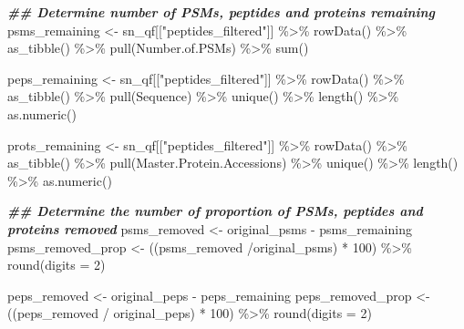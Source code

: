 \documentclass[9pt,a4paper,]{extarticle}
\newenvironment{Shaded}{\begin{snugshade}}{\end{snugshade}}
\newcommand{\AttributeTok}[1]{\textcolor[rgb]{0.77,0.63,0.00}{#1}}
\newcommand{\DecValTok}[1]{\textcolor[rgb]{0.00,0.00,0.81}{#1}}
\newcommand{\DocumentationTok}[1]{\textcolor[rgb]{0.56,0.35,0.01}{\textbf{\textit{#1}}}}
\newcommand{\FunctionTok}[1]{\textcolor[rgb]{0.00,0.00,0.00}{#1}}
\newcommand{\NormalTok}[1]{#1}
\newcommand{\OtherTok}[1]{\textcolor[rgb]{0.56,0.35,0.01}{#1}}
\newcommand{\SpecialCharTok}[1]{\textcolor[rgb]{0.00,0.00,0.00}{#1}}
\newcommand{\StringTok}[1]{\textcolor[rgb]{0.31,0.60,0.02}{#1}}
\begin{document}
\begin{Shaded}
\begin{Highlighting}[]
\DocumentationTok{\#\# Determine number of PSMs, peptides and proteins remaining}
\NormalTok{psms\_remaining }\OtherTok{\textless{}{-}}\NormalTok{ sn\_qf[[}\StringTok{"peptides\_filtered"}\NormalTok{]] }\SpecialCharTok{\%\textgreater{}\%}
  \FunctionTok{rowData}\NormalTok{() }\SpecialCharTok{\%\textgreater{}\%} 
  \FunctionTok{as\_tibble}\NormalTok{() }\SpecialCharTok{\%\textgreater{}\%} 
  \FunctionTok{pull}\NormalTok{(Number.of.PSMs) }\SpecialCharTok{\%\textgreater{}\%} 
  \FunctionTok{sum}\NormalTok{() }

\NormalTok{peps\_remaining }\OtherTok{\textless{}{-}}\NormalTok{ sn\_qf[[}\StringTok{"peptides\_filtered"}\NormalTok{]] }\SpecialCharTok{\%\textgreater{}\%}
  \FunctionTok{rowData}\NormalTok{() }\SpecialCharTok{\%\textgreater{}\%} 
  \FunctionTok{as\_tibble}\NormalTok{() }\SpecialCharTok{\%\textgreater{}\%} 
  \FunctionTok{pull}\NormalTok{(Sequence) }\SpecialCharTok{\%\textgreater{}\%} 
  \FunctionTok{unique}\NormalTok{() }\SpecialCharTok{\%\textgreater{}\%}
  \FunctionTok{length}\NormalTok{() }\SpecialCharTok{\%\textgreater{}\%}
  \FunctionTok{as.numeric}\NormalTok{()}

\NormalTok{prots\_remaining }\OtherTok{\textless{}{-}}\NormalTok{ sn\_qf[[}\StringTok{"peptides\_filtered"}\NormalTok{]] }\SpecialCharTok{\%\textgreater{}\%}
  \FunctionTok{rowData}\NormalTok{() }\SpecialCharTok{\%\textgreater{}\%} 
  \FunctionTok{as\_tibble}\NormalTok{() }\SpecialCharTok{\%\textgreater{}\%} 
  \FunctionTok{pull}\NormalTok{(Master.Protein.Accessions) }\SpecialCharTok{\%\textgreater{}\%} 
  \FunctionTok{unique}\NormalTok{() }\SpecialCharTok{\%\textgreater{}\%} 
  \FunctionTok{length}\NormalTok{() }\SpecialCharTok{\%\textgreater{}\%}
  \FunctionTok{as.numeric}\NormalTok{()}

\DocumentationTok{\#\# Determine the number of proportion of PSMs, peptides and proteins removed}
\NormalTok{psms\_removed }\OtherTok{\textless{}{-}}\NormalTok{ original\_psms }\SpecialCharTok{{-}}\NormalTok{ psms\_remaining}
\NormalTok{psms\_removed\_prop }\OtherTok{\textless{}{-}}\NormalTok{ ((psms\_removed }\SpecialCharTok{/}\NormalTok{original\_psms) }\SpecialCharTok{*} \DecValTok{100}\NormalTok{) }\SpecialCharTok{\%\textgreater{}\%}
  \FunctionTok{round}\NormalTok{(}\AttributeTok{digits =} \DecValTok{2}\NormalTok{)}

\NormalTok{peps\_removed }\OtherTok{\textless{}{-}}\NormalTok{ original\_peps }\SpecialCharTok{{-}}\NormalTok{ peps\_remaining}
\NormalTok{peps\_removed\_prop }\OtherTok{\textless{}{-}}\NormalTok{ ((peps\_removed }\SpecialCharTok{/}\NormalTok{ original\_peps) }\SpecialCharTok{*} \DecValTok{100}\NormalTok{) }\SpecialCharTok{\%\textgreater{}\%}
  \FunctionTok{round}\NormalTok{(}\AttributeTok{digits =} \DecValTok{2}\NormalTok{)}


\end{Highlighting}
\end{Shaded}
\end{document}

